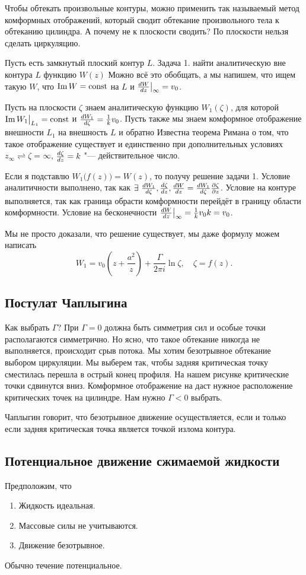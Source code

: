Чтобы обтекать произвольные контуры, можно применить так называемый метод комформных отображений, который сводит обтекание произвольного тела к обтеканию цилиндра. А почему не к плоскости сводить? По плоскости нельзя сделать циркуляцию.

Пусть есть замкнутый плоский контур $L$. Задача 1. найти аналитическую вне контура $L$ функцию $W(z)$
Можно всё это обобщать, а мы напишем, что ищем такую $W$, что $\mathop{\mathrm{Im}} W=\operatorname{const}$ на $L$ и $\frac{dW}{dz}\big|_\infty = v_0$.

Пусть на плоскости $\zeta$ знаем аналитическую функцию $W_1(\zeta)$, для которой $\mathop{\mathrm{Im}} W_1\big|_{L_1} = \operatorname{const}$ и $\frac{dW_1}{d\zeta} = \frac1kv_0$. Пусть также мы знаем комформное отображение внешности $L_1$ на внешность $L$ и обратно
Известна теорема Римана о том, что такое отображение существует и единственно при дополнительных условиях $z_\infty \rightleftharpoons\zeta=\infty$, $\frac{d\zeta}{dz} = k$ "--- действительное число.

Если я подставлю $W_1\big(f(z)\big) = W(z)$, то получу решение задачи 1. Условие аналитичности выполнено, так как $\exists\ \frac{dW_1}{d\zeta},\frac{d\zeta}{dz}, \frac{dW}{dz} = \frac{dW_1}{d\zeta}\frac{\partial \zeta}{\partial z}$. Условие на контуре выполняется, так как граница обрасти комформности перейдёт в границу области комформности. 
Условие на бесконечности $\frac{dW}{dz}\big|_\infty = \frac 1kv_0 k = v_0$.

Мы не просто доказали, что решение существует, мы даже формулу можем написать
\[
  W_1 = v_0\left(z+\frac{a^2}z\right) + \frac{\Gamma}{2\pi i}\ln\zeta,\quad \zeta = f(z).
\]

\subsection{Постулат Чаплыгина}
Как выбрать $\Gamma$?
При $\Gamma=0$ должна быть симметрия сил и особые точки располагаются симметрично. Но ясно, что такое обтекание никогда не выполняется, происходит срыв потока. Мы хотим безотрывное обтекание выбором циркуляции. Мы выберем так, чтобы задняя критическая точку сместилась перешла в острый конец профиля. На нашем рисунке критические точки сдвинутся вниз. Комформное отображение на даст нужное расположение критических точек на цилиндре. Нам нужно $\Gamma<0$ выбрать.

Чаплыгин говорит, что безотрывное движение осуществляется, если и только если задняя критическая точка является точкой излома контура.
\subsection{Потенциальное движение сжимаемой жидкости}
Предположим, что
\begin{enumerate}
	\item Жидкость идеальная.
	\item Массовые силы не учитываются.
	\item Движение безотрывное.
\end{enumerate}
Обычно течение потенциальное.


